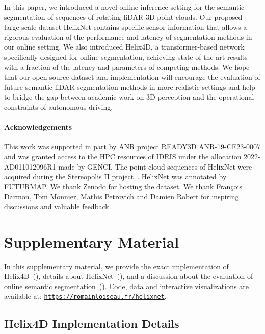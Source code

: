\documentclass[runningheads]{tpls/llncs}
\begin{document}
In this paper, we introduced a novel online inference setting for the semantic segmentation of sequences of rotating liDAR 3D point clouds. Our proposed large-scale dataset HelixNet contains specific sensor information that allows a rigorous evaluation of the performance and latency of segmentation methods in our online setting. We also introduced Helix4D, a transformer-based network specifically designed for online segmentation, achieving state-of-the-art results with a fraction of the latency and parameters of competing methods.
We hope that our open-source dataset and implementation will encourage the evaluation of future semantic liDAR segmentation methods in more realistic settings and help to bridge the gap between academic work on 3D perception and the operational constraints of autonomous driving. 
\paragraph*{Acknowledgements}This work was supported in part by ANR project READY3D ANR-19-CE23-0007 and was granted access to the HPC resources of IDRIS under the allocation 2022-AD011012096R1 made by GENCI. The point cloud sequences of HelixNet were acquired during the Stereopolis II project~\cite{stereopolis}. HelixNet was annotated by \href{https://www.futurmap.com/en/our-service/}{FUTURMAP}. We thank Zenodo for hosting the dataset. We thank François Darmon, Tom Monnier, Mathis Petrovich and Damien Robert for inspiring discussions and valuable feedback. 



\clearpage

\clearpage

\section{Supplementary Material}
In this supplementary material, we provide the exact implementation of Helix4D~(), details about HelixNet~(), and a discussion about the evaluation of online semantic segmentation~(). Code, data and interactive visualizations are available at: {\tt{\url{https://romainloiseau.fr/helixnet}}}.

\subsection{Helix4D Implementation Details}\label{sec::implementation_details}
\end{document}
